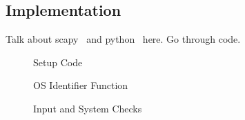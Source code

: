 \subsection{Implementation}
Talk about scapy~\cite{Scapy} and python~\cite{Python} here.
Go through code.

\begin{figure}[p]
	\caption{\label{fig:setupCode} Setup Code}
\end{figure}

\begin{figure}[p]
	\caption{\label{fig:osFunction} OS Identifier Function}
\end{figure}

\begin{figure}[p]
	\caption{\label{fig:prepare} Input and System Checks}
\end{figure}

